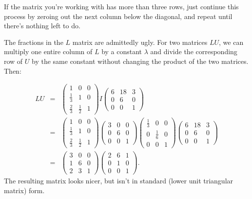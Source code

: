 If the matrix you're working with has more than three rows, just continue this process by zeroing out the next column below the diagonal, and repeat until there's nothing left to do.


The fractions in the $L$ matrix are admittedly ugly.  For two matrices $LU$, we can multiply one entire column of $L$ by a constant $\lambda$ and divide the corresponding row of $U$ by the same constant without changing the product of the two matrices.  Then:

\begin{eqnarray*}
LU &=& \begin{pmatrix}
1 & 0 & 0 \\[1mm]
\frac{1}{3} & 1 & 0 \\[1mm]
\frac{2}{3} & \frac{1}{2} & 1 
\end{pmatrix}
I
\begin{pmatrix}
6 & 18 & 3 \\[1mm]
0 & 6 & 0 \\[1mm]
0 & 0 & 1 
\end{pmatrix} \\
&=&
\begin{pmatrix}
1 & 0 & 0 \\[1mm]
\frac{1}{3} & 1 & 0 \\[1mm]
\frac{2}{3} & \frac{1}{2} & 1 
\end{pmatrix}
\begin{pmatrix}
3 & 0 & 0 \\
0 & 6 & 0 \\
0 & 0 & 1 
\end{pmatrix}
\begin{pmatrix}
\frac{1}{3} & 0 & 0 \\[1mm]
0 & \frac{1}{6} & 0 \\[1mm]
0 & 0 & 1 
\end{pmatrix}
\begin{pmatrix}
6 & 18 & 3 \\
0 & 6 & 0 \\
0 & 0 & 1 
\end{pmatrix} \\
&=&
\begin{pmatrix}
3 & 0 & 0 \\
1 & 6 & 0 \\
2 & 3 & 1 
\end{pmatrix}\begin{pmatrix}
2 & 6 & 1 \\
0 & 1 & 0 \\
0 & 0 & 1 
\end{pmatrix}.
\end{eqnarray*}
The resulting matrix looks nicer, but isn't in standard (lower unit triangular matrix) form.

